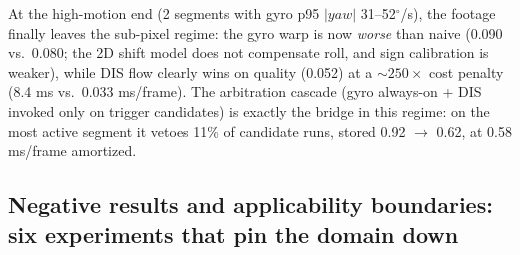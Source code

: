 \documentclass[12pt,a4paper]{article}
\begin{document}
At the high-motion end (2 segments with gyro p95 $|yaw|$ 31--52$^\circ$/s), the footage finally leaves the sub-pixel regime: the gyro warp is now \emph{worse} than naive (0.090 vs.\ 0.080; the 2D shift model does not compensate roll, and sign calibration is weaker), while DIS flow clearly wins on quality (0.052) at a ${\sim}250\times$ cost penalty (8.4 ms vs.\ 0.033 ms/frame). The arbitration cascade (gyro always-on + DIS invoked only on trigger candidates) is exactly the bridge in this regime: on the most active segment it vetoes 11\% of candidate runs, stored 0.92 $\to$ 0.62, at 0.58 ms/frame amortized.
\label{sec:arbiter}

\subsection{Negative results and applicability boundaries: six experiments that pin the domain down}
\label{sec:negatives}
\end{document}
